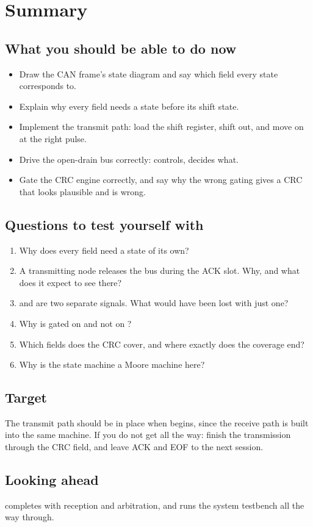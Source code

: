 
\section{Summary}
\label{c16:sec:review}

\subsection*{What you should be able to do now}
\begin{itemize}
  \item Draw the CAN frame's state diagram and say which field every state corresponds to.
  \item Explain why every field needs a  state before its shift state.
  \item Implement the transmit path: load the shift register, shift out, and move on at the right
    pulse.
  \item Drive the open-drain bus correctly:  controls,  decides what.
  \item Gate the CRC engine correctly, and say why the wrong gating gives a CRC that looks plausible
    and is wrong.
\end{itemize}

\subsection*{Questions to test yourself with}
\begin{enumerate}
  \item Why does every field need a  state of its own?
  \item A transmitting node releases the bus during the ACK slot. Why, and what does it expect to see
    there?
  \item {} and  are two separate signals. What would have been lost with just
    one?
  \item Why is  gated on  and not on ?
  \item Which fields does the CRC cover, and where exactly does the coverage end?
  \item Why is the state machine a Moore machine here?
\end{enumerate}

\subsection*{Target}
The transmit path should be in place when  begins, since the receive path is built
into the same machine. If you do not get all the way: finish the transmission through the CRC field,
and leave ACK and EOF to the next session.

\subsection*{Looking ahead}
 completes  with reception and arbitration, and runs the system
testbench all the way through.
